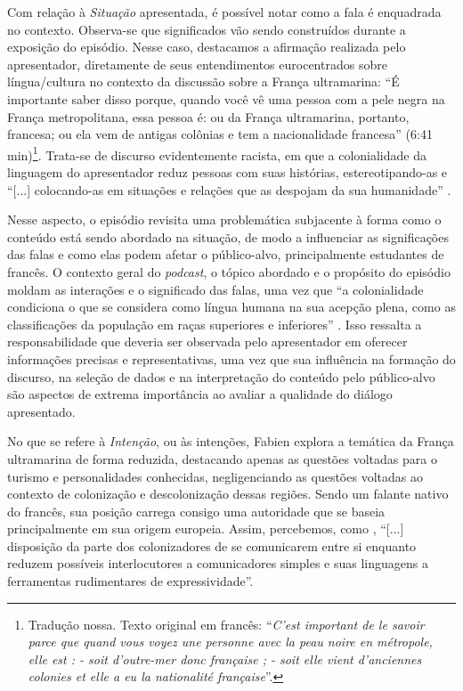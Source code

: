 \documentclass[portuguese]{textolivre}
\begin{document}
Com relação à \emph{Situação} apresentada, é possível notar como a fala é enquadrada no contexto. Observa-se que significados vão sendo construídos durante a exposição do episódio. Nesse caso, destacamos a afirmação realizada pelo apresentador, diretamente de seus entendimentos eurocentrados sobre língua/cultura no contexto da discussão sobre a França ultramarina: “É importante saber disso porque, quando você vê uma pessoa com a pele negra na França metropolitana, essa pessoa é: ou da França ultramarina, portanto, francesa; ou ela vem de antigas colônias e tem a nacionalidade francesa” (6:41 min)\footnote{Tradução nossa. Texto original em francês: “\textit{C’est important de le savoir parce que quand vous voyez une personne avec la peau noire en métropole, elle est : - soit d’outre-mer donc française ; - soit elle vient d’anciennes colonies et elle a eu la nationalité française}”.}. Trata-se de discurso evidentemente racista, em que a colonialidade da linguagem do apresentador reduz pessoas com suas histórias, estereotipando-as e “[...] colocando-as em situações e relações que as despojam da sua humanidade” \cite[p. 86]{veronelli_sobre_2021}.

Nesse aspecto, o episódio revisita uma problemática subjacente à forma como o conteúdo está sendo abordado na situação, de modo a influenciar as significações das falas e como elas podem afetar o público-alvo, principalmente estudantes de francês. O contexto geral do \textit{podcast}, o tópico abordado e o propósito do episódio moldam as interações e o significado das falas, uma vez que “a colonialidade condiciona o que se considera como língua humana na sua acepção plena, como as classificações da população em raças superiores e inferiores” \cite[p. 89]{veronelli_sobre_2021}. Isso ressalta a responsabilidade que deveria ser observada pelo apresentador em oferecer informações precisas e representativas, uma vez que sua influência na formação do discurso, na seleção de dados e na interpretação do conteúdo pelo público-alvo são aspectos de extrema importância ao avaliar a qualidade do diálogo apresentado.

No que se refere à \emph{Intenção}, ou às intenções, Fabien explora a temática da França ultramarina de forma reduzida, destacando apenas as questões voltadas para o turismo e personalidades conhecidas, negligenciando as questões voltadas ao contexto de colonização e descolonização dessas regiões. Sendo um falante nativo do francês, sua posição carrega consigo uma autoridade que se baseia principalmente em sua origem europeia. Assim, percebemos, como \textcite[p. 94]{veronelli_sobre_2021}, “[...] disposição da parte dos colonizadores de se comunicarem entre si enquanto reduzem possíveis interlocutores a comunicadores simples e suas linguagens a ferramentas rudimentares de expressividade”.
\end{document}
